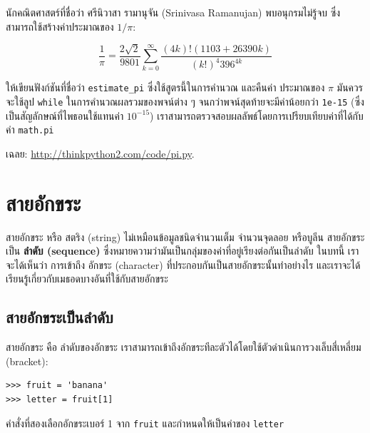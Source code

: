\begin{exercise}

นักคณิตศาสตร์ที่ชื่อว่า ศรีนิวาสา รามานุจัน (Srinivasa Ramanujan) 
พบอนุกรมไม่รู้จบ ซึ่งสามารถใช้สร้างค่าประมาณของ $1 / \pi$:

\[ \frac{1}{\pi} = \frac{2\sqrt{2}}{9801} 
\sum^\infty_{k=0} \frac{(4k)!(1103+26390k)}{(k!)^4 396^{4k}} \]

ให้เขียนฟังก์ชันที่ชื่อว่า \verb"estimate_pi" ซึ่งใช้สูตรนี้ในการคำนวณ และคืนค่า
ประมาณของ $\pi$ มันควรจะใช้ลูป {\tt while} ในการคำนวณผลรวมของพจน์ต่าง ๆ 
จนกว่าพจน์สุดท้ายจะมีค่าน้อยกว่า {\tt 1e-15} (ซึ่งเป็นสัญลักษณ์ที่ไพธอนใช้แทนค่า $10^{-15}$)
เราสามารถตรวจสอบผลลัพธ์โดยการเปรียบเทียบค่าที่ได้กับค่า {\tt math.pi}

เฉลย: \url{http://thinkpython2.com/code/pi.py}.

\end{exercise}



\chapter{สายอักขระ} %
\label{strings}

สายอักขระ หรือ สตริง (string) ไม่เหมือนข้อมูลชนิดจำนวนเต็ม จำนวนจุดลอย หรือบูลีน  สายอักขระเป็น {\bf ลำดับ (sequence)}
ซึ่งหมายความว่ามันเป็นกลุ่มของค่าที่อยู่เรียงต่อกันเป็นลำดับ  ในบทนี้ เราจะได้เห็นว่า 
การเข้าถึง อักขระ (character) ที่ประกอบกันเป็นสายอักขระนั้นทำอย่างไร และเราจะได้
เรียนรู้เกี่ยวกับเมธอดบางอันที่ใช้กับสายอักขระ 

\section{สายอักขระเป็นลำดับ}%


สายอักขระ คือ ลำดับของอักขระ 
เราสามารถเข้าถึงอักขระทีละตัวได้โดยใช้ตัวดำเนินการวงเล็บสี่เหลี่ยม (bracket):


\begin{verbatim}
>>> fruit = 'banana'
>>> letter = fruit[1]
\end{verbatim}
%
คำสั่งที่สองเลือกอักขระเบอร์ 1 จาก {\tt fruit} และกำหนดให้เป็นค่าของ {\tt letter}

